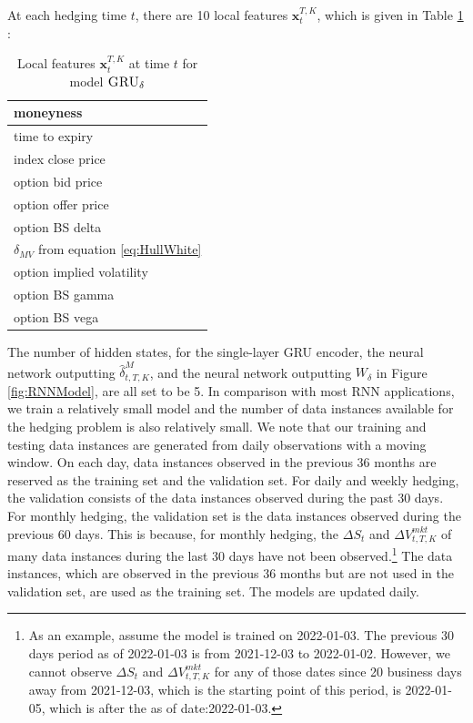 \documentclass[letterpaper,12pt,titlepage,oneside,final]{book}
\numberwithin{equation}{section}
\theoremstyle{definition}
\newcommand{\model}{\textsc{GRU}_\delta}
\newcommand{\vx}{\mathbf{x}}
\newcommand{\DS}{\Delta S}
\begin{document}
At each hedging time $t$, there are 10 local features  $\vx_{t}^{T,K}$, which is given in Table \ref{table:LocalSeqForLocal} :
\begin{table}[htp!]
	\centering
	\begin{tabular}{|l|}
		\hline
		moneyness \\ \hline
		time to expiry\\ \hline
		index close price\\ \hline
		option bid price\\ \hline
		option offer price\\ \hline
		option BS delta\\ \hline
		$\delta_{MV}$ from equation \eqref{eq:HullWhite} \\ \hline
		option implied volatility\\ \hline
		option BS gamma\\ \hline
		option BS vega\\ \hline
	\end{tabular}
	
	\caption{Local features  $\vx_{t}^{T,K}$ at time $t$ for model $\model$}
	\label{table:LocalSeqForLocal}
\end{table}

The number of hidden states, for the single-layer GRU encoder, the neural network outputting $\widehat{\delta}^M_{t,T,K}$, and the neural network outputting $W_{\delta}$  in Figure \ref{fig:RNNModel}, are all set to be 5.   In comparison with most RNN applications,  we train a relatively small model and the number of data instances available for the hedging problem is also relatively small.
We note that our training and testing data instances are generated from daily observations with a moving window.  On each day, data instances observed in the previous 36 months are reserved as the training set and the validation set. For daily and weekly hedging, the validation consists of the data instances observed during the past 30 days. For monthly hedging, the validation set is the data instances observed during the previous 60 days. This is because, for monthly hedging, the  $\DS_t$ and $\Delta V^{mkt}_{t,T,K}$  of many data instances during the last 30 days have not been observed.\footnote{As an example, assume the model is trained on 2022-01-03.  The previous 30 days period as of 2022-01-03 is from  2021-12-03 to 2022-01-02.  However, we cannot observe $\DS_t$ and $\Delta V^{mkt}_{t,T,K}$ for any of those dates since 20 business days away from 2021-12-03, which is the starting point of this period, is 2022-01-05, which is after the as of date:2022-01-03.}
The data instances, which are observed in the previous 36 months but are not used in the validation set, are used as the training set.
The models are updated daily.
\end{document}
